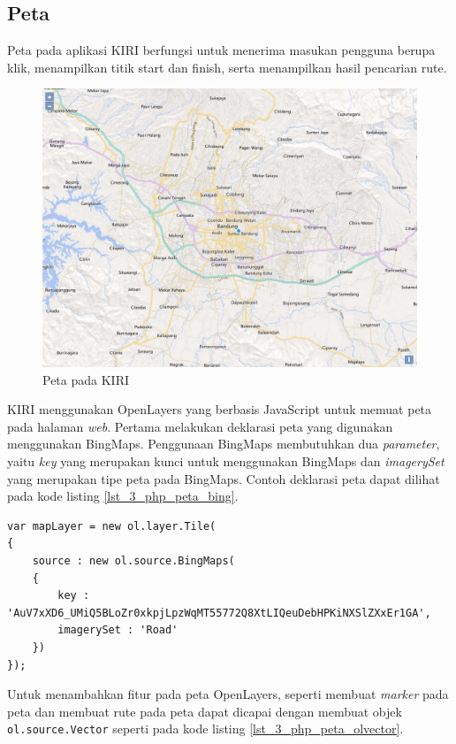 \subsection{Peta}
Peta pada aplikasi KIRI berfungsi untuk menerima masukan pengguna berupa klik,  menampilkan titik start dan finish, serta menampilkan hasil pencarian rute.

\begin{figure}[H]
	\centering
	\includegraphics[scale=0.4]{Gambar/KIRI-peta}
	\caption{Peta pada KIRI} 
	\label{fig:3_KIRI_peta}
\end{figure}

KIRI menggunakan OpenLayers yang berbasis JavaScript untuk memuat peta pada halaman \textit{web}. Pertama melakukan deklarasi peta yang digunakan menggunakan BingMaps. Penggunaan BingMaps membutuhkan dua \textit{parameter}, yaitu \textit{key} yang merupakan kunci untuk menggunakan BingMaps dan \textit{imagerySet} yang merupakan tipe peta pada BingMaps. Contoh deklarasi peta dapat dilihat pada kode listing \ref{lst_3_php_peta_bing}.

\begin{lstlisting}[caption=Deklarasi peta BingMaps,label = {lst_3_php_peta_bing}]
var mapLayer = new ol.layer.Tile(
{
	source : new ol.source.BingMaps(
	{
		key : 'AuV7xXD6_UMiQ5BLoZr0xkpjLpzWqMT55772Q8XtLIQeuDebHPKiNXSlZXxEr1GA',
		imagerySet : 'Road'
	})
});
\end{lstlisting}

Untuk menambahkan fitur pada peta OpenLayers, seperti membuat \textit{marker} pada peta dan membuat rute pada peta dapat dicapai dengan membuat objek \verb!ol.source.Vector! seperti pada kode listing \ref{lst_3_php_peta_olvector}.

